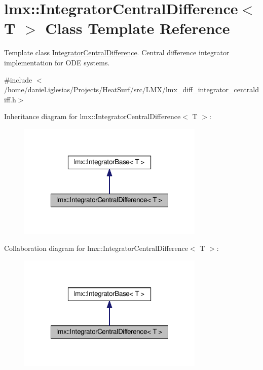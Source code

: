 \hypertarget{classlmx_1_1IntegratorCentralDifference}{\section{lmx\-:\-:Integrator\-Central\-Difference$<$ T $>$ Class Template Reference}
\label{classlmx_1_1IntegratorCentralDifference}
}


Template class \hyperlink{classlmx_1_1IntegratorCentralDifference}{Integrator\-Central\-Difference}. Central difference integrator implementation for O\-D\-E systems.  




{\ttfamily \#include $<$/home/daniel.\-iglesias/\-Projects/\-Heat\-Surf/src/\-L\-M\-X/lmx\-\_\-diff\-\_\-integrator\-\_\-centraldiff.\-h$>$}



Inheritance diagram for lmx\-:\-:Integrator\-Central\-Difference$<$ T $>$\-:
\nopagebreak
\begin{figure}[H]
\begin{center}
\leavevmode
\includegraphics[width=252pt]{classlmx_1_1IntegratorCentralDifference__inherit__graph}
\end{center}
\end{figure}


Collaboration diagram for lmx\-:\-:Integrator\-Central\-Difference$<$ T $>$\-:
\nopagebreak
\begin{figure}[H]
\begin{center}
\leavevmode
\includegraphics[width=252pt]{classlmx_1_1IntegratorCentralDifference__coll__graph}
\end{center}
\end{figure}
